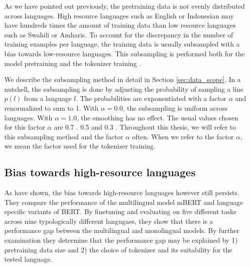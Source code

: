 As we have pointed out previously, the pretraining data is not evenly distributed across languages. High resource languages such as English or Indonesian may have hundreds times the amount of training data than low resource languages such as Swahili or Amharic. 
To account for the discrepancy in the number of training examples per language, the training data is usually subsampled with a bias towards low-resource languages. This subsampling is performed both for the model pretraining and the tokenizer training \cite{devlin_bert_2019,lample_cross-lingual_2019}. 

We describe the subsampling method in detail in Section \ref{sec:data_scope}. In a nutshell, the subsampling is done by adjusting the probability of sampling a line $p(l)$ from a language $l$. The probabilities are exponentiated with a factor $\alpha$ and renormalized to sum to 1. With $\alpha=0.0$, the subsampling is uniform across languages. With $\alpha=1.0$, the smoothing has no effect. The usual values chosen for this factor $\alpha$ are 0.7 \cite{devlin_bert_2019}. 0.5 \cite{lample_cross-lingual_2019} and 0.3 \cite{conneau_unsupervised_2020}. Throughout this thesis, we will refer to this subsampling method and the factor $\alpha$ often. When we refer to the factor $\alpha$, we mean the factor used for the tokenizer training.

\subsection{Bias towards high-resource languages}

As \citet{rust_how_2021} have shown, the bias towards high-resource languages however still persists. They compare the performance of the multilingual model mBERT and language specific variants of BERT. By finetuning and evaluating on five different tasks across nine typologically different langugaes, they show that there is a performance gap between the multilingual and monolingual models. By further examination they determine that the performance gap may be explained by 1) pretraining data size and 2) the choice of tokenizer and its suitability for the tested language. 

